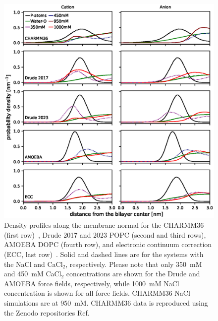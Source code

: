 \documentclass[journal=jacsat,manuscript=article,layout=singlecolumn]{achemso}
\begin{document}
\begin{figure}[!hbt]
    \centering
    \includegraphics{Figures/ion_density_profiles_with_chloride.eps}
    \caption{Density profiles along the membrane normal for the CHARMM36 (first row)~\cite{Catte2016}, Drude 2017 and 2023 POPC (second and third rows), AMOEBA DOPC (fourth row), and electronic continuum correction (ECC, last row)~\cite{Melcr:2018a}. Solid and dashed lines are for the systems with the NaCl and CaCl$_{2}$, respectively. Please note that only 350~mM and 450~mM CaCl$_{2}$ concentrations are shown for the Drude and AMOEBA force fields, respectively, while 1000~mM NaCl concentration is shown for all force fields. CHARMM36 NaCl simulations are at 950~mM. CHARMM36 data is reproduced using the Zenodo repositories Ref.~\cite{ollila_2015_32496, ollila_2015_32497, ollila_2015_32498, nencini_ricky_2019_3434396}}
    \label{fig:ion_density_profiles}
\end{figure}
\end{document}
